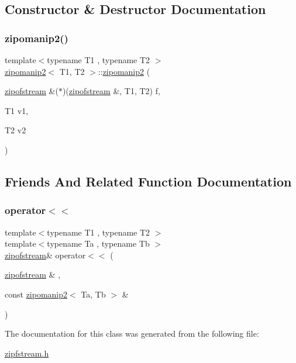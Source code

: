 \subsection{Constructor \& Destructor Documentation}
\mbox{\label{classzipomanip2_a58a75e53b160944fd2a2c64f472b5695}} 
\subsubsection{\texorpdfstring{zipomanip2()}{zipomanip2()}}
{\footnotesize\ttfamily template$<$typename T1 , typename T2 $>$ \\
\hyperlink{classzipomanip2}{zipomanip2}$<$ T1, T2 $>$\+::\hyperlink{classzipomanip2}{zipomanip2} (\begin{DoxyParamCaption}\item[{\hyperlink{classzipofstream}{zipofstream} \&($\ast$)(\hyperlink{classzipofstream}{zipofstream} \&, T1, T2)}]{f,  }\item[{T1}]{v1,  }\item[{T2}]{v2 }\end{DoxyParamCaption})\hspace{0.3cm}{\ttfamily [inline]}}



\subsection{Friends And Related Function Documentation}
\mbox{\label{classzipomanip2_afab8cebae2ff57cf3f87fe3165a974e3}} 
\subsubsection{\texorpdfstring{operator$<$$<$}{operator<<}}
{\footnotesize\ttfamily template$<$typename T1 , typename T2 $>$ \\
template$<$typename Ta , typename Tb $>$ \\
\hyperlink{classzipofstream}{zipofstream}\& operator$<$$<$ (\begin{DoxyParamCaption}\item[{\hyperlink{classzipofstream}{zipofstream} \&}]{,  }\item[{const \hyperlink{classzipomanip2}{zipomanip2}$<$ Ta, Tb $>$ \&}]{ }\end{DoxyParamCaption})\hspace{0.3cm}{\ttfamily [friend]}}



The documentation for this class was generated from the following file\+:\begin{DoxyCompactItemize}
\item 
\hyperlink{zipfstream_8h}{zipfstream.\+h}\end{DoxyCompactItemize}
